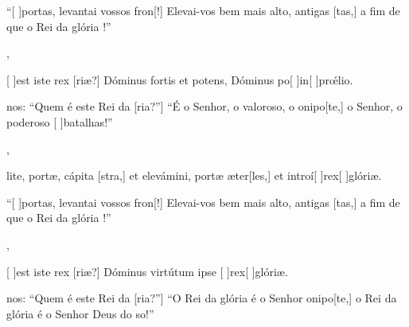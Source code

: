 {    {\item {}``[ ]{por}tas, levantai vossos fron[!] Elevai-vos bem mais alto, antigas [tas,] a fim de que o Rei da glória !''~\Antiphona},
  {\item {}[ ]{est} iste rex [riæ?] Dóminus fortis et potens, Dóminus po[ ]{in}[ ]{prœ́}lio.~\Antiphona}%
    {\item {}nos: ``Quem é este Rei da [ria?''] ``É o Senhor, o valoroso, o onipo[te,] o Senhor, o poderoso [ ]{ba}{ta}lhas!''~\Antiphona},
  {\item {}lite, portæ, cápita [stra,] et elevámini, portæ æter[les,] et introí[ ]{rex}[ ]{gló}riæ.~\Antiphona}%
    {\item {}``[ ]{por}tas, levantai vossos fron[!] Elevai-vos bem mais alto, antigas [tas,] a fim de que o Rei da glória !''~\Antiphona},
  {\item {}[ ]{est} iste rex [riæ?] Dóminus virtútum ipse [ ]{rex}[ ]{gló}riæ.~\Antiphona}%
    {\item {}nos: ``Quem é este Rei da [ria?''] ``O Rei da glória é o Senhor onipo[te,] o Rei da glória é o Senhor Deus do so!''~\Antiphona}
}